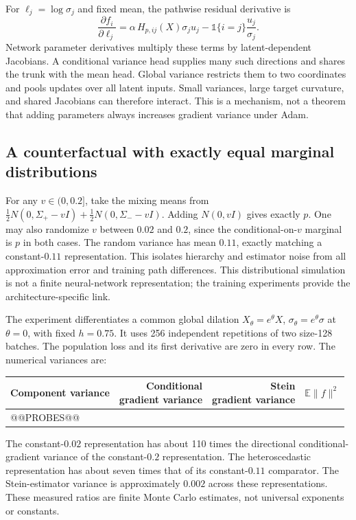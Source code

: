 \documentclass[11pt,a4paper]{article}
\numberwithin{equation}{section}
\newcommand{\E}{\mathbb E}
\begin{document}
For $\ell_j=\log\sigma_j$ and fixed mean, the pathwise residual derivative is
\[
 \frac{\partial f_i}{\partial\ell_j}
 =\alpha\,H_{p,ij}(X)\sigma_j u_j
          -\mathbb 1\{i=j\}\frac{u_j}{\sigma_j}.
\]
Network parameter derivatives multiply these terms by latent-dependent
Jacobians. A conditional variance head supplies many such directions and
shares the trunk with the mean head. Global variance restricts them to two
coordinates and pools updates over all latent inputs. Small variances,
large target curvature, and shared Jacobians can therefore interact.
This is a mechanism, not a theorem that adding parameters always increases
gradient variance under Adam.

\subsection{A counterfactual with exactly equal marginal distributions}
For any $v\in(0,0.2]$, take the mixing means from
$\tfrac12N(0,\Sigma_+-vI)+\tfrac12N(0,\Sigma_--vI)$.
Adding $N(0,vI)$ gives exactly $p$. One may also randomize $v$ between
$0.02$ and $0.2$, since the conditional-on-$v$ marginal is $p$ in both cases.
The random variance has mean $0.11$, exactly matching a constant-$0.11$
representation. This isolates hierarchy and estimator noise from all
approximation error and training path differences. This distributional
simulation is not a finite neural-network representation; the training
experiments provide the architecture-specific link.

The experiment differentiates a common global dilation
$X_\theta=e^\theta X$, $\sigma_\theta=e^\theta\sigma$ at $\theta=0$,
with fixed $h=0.75$. It uses 256 independent repetitions of two size-128
batches. The population loss and its first derivative are zero in every
row. The numerical variances are:
\begin{center}
\begin{tabular}{lrrr}\toprule
Component variance & \shortstack{Conditional\\gradient variance} & \shortstack{Stein\\gradient variance} & $\E\|f\|^2$\\\midrule
@@PROBES@@
\bottomrule\end{tabular}
\end{center}
The constant-$0.02$ representation has about 110 times the directional
conditional-gradient variance of the constant-$0.2$ representation. The
heteroscedastic representation has about seven times that of its
constant-$0.11$ comparator. The Stein-estimator variance is approximately
$0.002$ across these representations. These measured ratios are finite
Monte Carlo estimates, not universal exponents or constants.
\end{document}
